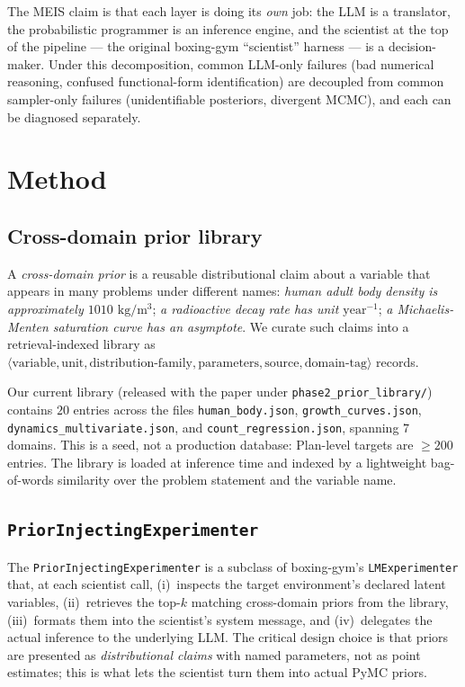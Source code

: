 \documentclass{article}
\begin{document}
The MEIS claim is that each layer is doing its \emph{own} job: the
LLM is a translator, the probabilistic programmer is an inference
engine, and the scientist at the top of the pipeline --- the
original boxing-gym ``scientist'' harness --- is a decision-maker.
Under this decomposition, common LLM-only failures (bad
numerical reasoning, confused functional-form identification) are
decoupled from common sampler-only failures (unidentifiable posteriors,
divergent MCMC), and each can be diagnosed separately.

\section{Method}
\label{sec:method}

\subsection{Cross-domain prior library}
\label{sec:prior-library}

A \emph{cross-domain prior} is a reusable distributional claim
about a variable that appears in many problems under different names:
\emph{human adult body density is approximately $1010$
$\mathrm{kg}/\mathrm{m}^{3}$}; \emph{a radioactive decay rate has
unit $\mathrm{year}^{-1}$}; \emph{a Michaelis-Menten saturation
curve has an asymptote}. We curate such claims into a
retrieval-indexed library as $\langle\text{variable},
\text{unit}, \text{distribution-family}, \text{parameters},
\text{source}, \text{domain-tag}\rangle$ records.

Our current library (released with the paper under
\texttt{phase2\_prior\_library/}) contains $20$ entries across the
files \texttt{human\_body.json}, \texttt{growth\_curves.json},
\texttt{dynamics\_multivariate.json}, and
\texttt{count\_regression.json}, spanning $7$ domains. This is a seed, not a production database: Plan-level
targets are $\geq 200$ entries. The library is loaded at inference
time and indexed by a lightweight bag-of-words similarity over the
problem statement and the variable name.

\subsection{\texttt{PriorInjectingExperimenter}}
\label{sec:prior-injecting}

The \texttt{PriorInjectingExperimenter} is a subclass of
boxing-gym's \texttt{LMExperimenter} that, at each scientist call,
(i)~inspects the target environment's declared latent variables,
(ii)~retrieves the top-$k$ matching cross-domain priors from the
library, (iii)~formats them into the scientist's system message,
and (iv)~delegates the actual inference to the underlying LLM. The
critical design choice is that priors are presented as
\emph{distributional claims} with named parameters, not as
point estimates; this is what lets the scientist turn them into
actual PyMC priors.
\end{document}
